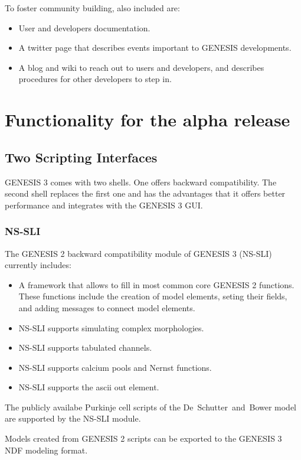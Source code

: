 \documentclass[12pt]{article}
\begin{document}
To foster community building, also included are:
\begin{itemize}
\item User and developers documentation.
\item A twitter page that describes events important to GENESIS
  developments.
\item A blog and wiki to reach out to users and developers, and
  describes procedures for other developers to step in.
\end{itemize}


\section{Functionality for the alpha release}

\subsection{Two Scripting Interfaces}

GENESIS 3 comes with two shells.  One offers backward compatibility.
The second shell replaces the first one and has the advantages that it
offers better performance and integrates with the GENESIS 3 GUI.

\subsubsection{NS-SLI}
The GENESIS 2 backward compatibility module of GENESIS 3 (NS-SLI)
currently includes:
\begin{itemize}
\item A framework that allows to fill in most common core GENESIS 2
  functions.  These functions include the creation of model elements,
  seting their fields, and adding messages to connect model elements.
\item NS-SLI supports simulating complex morphologies.
\item NS-SLI supports tabulated channels.
\item NS-SLI supports calcium pools and Nernst functions.
\item NS-SLI supports the ascii out element.
\end{itemize}

The publicly availabe Purkinje cell scripts of the
De~Schutter~and~Bower model are supported by the NS-SLI module.

Models created from GENESIS 2 scripts can be exported to the GENESIS 3
NDF modeling format.
\end{document}
